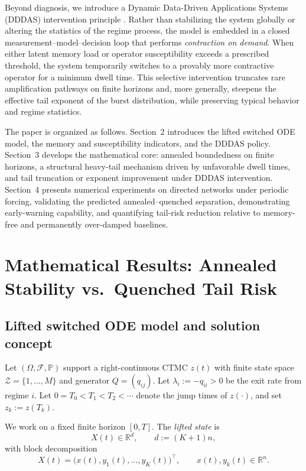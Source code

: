 \documentclass[12pt,a4paper]{article}
\theoremstyle{definition}
\theoremstyle{remark}
\begin{document}
Beyond diagnosis, we introduce a Dynamic Data-Driven Applications Systems (DDDAS) intervention principle \cite{darema2009}. Rather than stabilizing the system globally or altering the statistics of the regime process, the model is embedded in a closed measurement–model–decision loop that performs \emph{contraction on demand}. When either latent memory load or operator susceptibility exceeds a prescribed threshold, the system temporarily switches to a provably more contractive operator for a minimum dwell time. This selective intervention truncates rare amplification pathways on finite horizons and, more generally, steepens the effective tail exponent of the burst distribution, while preserving typical behavior and regime statistics.

The paper is organized as follows. Section~2 introduces the lifted switched ODE model, the memory and susceptibility indicators, and the DDDAS policy. Section~3 develops the mathematical core: annealed boundedness on finite horizons, a structural heavy-tail mechanism driven by unfavorable dwell times, and tail truncation or exponent improvement under DDDAS intervention. Section~4 presents numerical experiments on directed networks under periodic forcing, validating the predicted annealed–quenched separation, demonstrating early-warning capability, and quantifying tail-risk reduction relative to memory-free and permanently over-damped baselines.



\section{Mathematical Results: Annealed Stability vs.\ Quenched Tail Risk}
\label{sec:math_results}

\subsection{Lifted switched ODE model and solution concept}
\label{subsec:lifted_model_solution}

Let $(\Omega,\mathcal{F},\mathbb{P})$ support a right-continuous CTMC $z(t)$ with finite state space
$\mathcal{Z}=\{1,\dots,M\}$ and generator $Q=(q_{ij})$. Let $\lambda_i:=-q_{ii}>0$ be the exit rate from regime $i$.
Let $0=T_0<T_1<T_2<\cdots$ denote the jump times of $z(\cdot)$, and set $z_k:=z(T_k)$.

We work on a fixed finite horizon $[0,T]$. The \emph{lifted state} is
\[
X(t)\in\mathbb{R}^d,\qquad d:=(K+1)n,
\]
with block decomposition
\[
X(t)=\big(x(t),y_1(t),\dots,y_K(t)\big)^\top,\qquad x(t),y_k(t)\in\mathbb{R}^n.
\]
\end{document}
